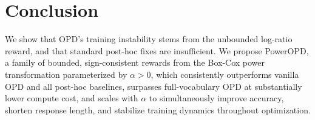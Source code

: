 \section{Conclusion}
\label{sec:conclusion}
 
We show that OPD's training instability stems from the unbounded log-ratio reward, and that standard post-hoc fixes are insufficient.
We propose PowerOPD, a family of bounded, sign-consistent rewards from the Box-Cox power transformation parameterized by $\alpha > 0$, which consistently outperforms vanilla OPD and all post-hoc baselines, surpasses full-vocabulary OPD at substantially lower compute cost, and scales with $\alpha$ to simultaneously improve accuracy, shorten response length, and stabilize training dynamics throughout optimization.